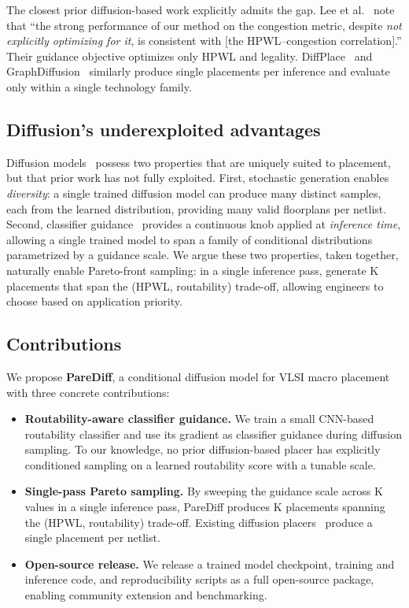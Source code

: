 \documentclass{ieeeaccess}
\begin{document}
The closest prior diffusion-based work explicitly admits the gap. Lee et al.~\cite{lee2024chipdiffusion} note that ``the strong performance of our method on the congestion metric, despite \emph{not explicitly optimizing for it}, is consistent with [the HPWL--congestion correlation].'' Their guidance objective optimizes only HPWL and legality. DiffPlace~\cite{trung2025diffplace} and GraphDiffusion~\cite{fang2025graphdiffusion} similarly produce single placements per inference and evaluate only within a single technology family.

\subsection{Diffusion's underexploited advantages}

Diffusion models~\cite{ho2020ddpm, song2021ddim} possess two properties that are uniquely suited to placement, but that prior work has not fully exploited. First, stochastic generation enables \emph{diversity}: a single trained diffusion model can produce many distinct samples, each from the learned distribution, providing many valid floorplans per netlist. Second, classifier guidance~\cite{dhariwal2021guidance} provides a continuous knob applied at \emph{inference time}, allowing a single trained model to span a family of conditional distributions parametrized by a guidance scale. We argue these two properties, taken together, naturally enable Pareto-front sampling: in a single inference pass, generate K placements that span the (HPWL, routability) trade-off, allowing engineers to choose based on application priority.

\subsection{Contributions}

We propose \textbf{PareDiff}, a conditional diffusion model for VLSI macro placement with three concrete contributions:

\begin{itemize}
\item \textbf{Routability-aware classifier guidance.} We train a small CNN-based routability classifier and use its gradient as classifier guidance during diffusion sampling. To our knowledge, no prior diffusion-based placer has explicitly conditioned sampling on a learned routability score with a tunable scale.

\item \textbf{Single-pass Pareto sampling.} By sweeping the guidance scale across K values in a single inference pass, PareDiff produces K placements spanning the (HPWL, routability) trade-off. Existing diffusion placers~\cite{lee2024chipdiffusion, trung2025diffplace, fang2025graphdiffusion} produce a single placement per netlist.

\item \textbf{Open-source release.} We release a trained model checkpoint, training and inference code, and reproducibility scripts as a full open-source package, enabling community extension and benchmarking.
\end{itemize}
\end{document}
